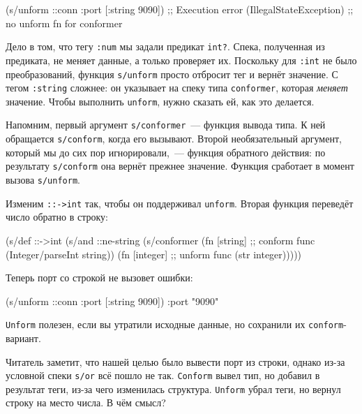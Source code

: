 \else

\begin{english}
  \begin{clojure}
(s/unform ::conn {:port [:string 9090]})
;; Execution error (IllegalStateException)
;; no unform fn for conformer
  \end{clojure}
\end{english}

\fi

Дело в том, что тегу \verb|:num| мы задали предикат \verb|int?|. Спека,
полученная из предиката, не меняет данные, а только проверяет их. Поскольку для
\verb|:int| не было преобразований, функция \verb|s/unform| просто отбросит тег
и вернёт значение. С тегом \verb|:string| сложнее: он указывает на спеку типа
\verb|conformer|, которая \emph{меняет} значение. Чтобы выполнить \verb|unform|,
нужно сказать ей, как это делается.


Напомним, первый аргумент \verb|s/conformer|~--- функция вывода типа. К ней
обращается \verb|s/conform|, когда его вызывают. Второй необязательный аргумент,
который мы до сих пор игнорировали,~--- функция обратного действия: по
результату \verb|s/conform| она вернёт прежнее значение. Функция сработает в
момент вызова \verb|s/unform|.

Изменим \verb|::->int| так, чтобы он поддерживал \verb|unform|. Вторая функция
переведёт число обратно в строку:

\begin{english}
  \begin{clojure}
(s/def ::->int
  (s/and
   ::ne-string
   (s/conformer
    (fn [string] ;; conform func
      (Integer/parseInt string))
    (fn [integer] ;; unform func
      (str integer)))))
  \end{clojure}
\end{english}

\noindent
Теперь порт со строкой не вызовет ошибки:

\begin{english}
  \begin{clojure}
(s/unform ::conn {:port [:string 9090]})
{:port "9090"}
  \end{clojure}
\end{english}

\verb|Unform| полезен, если вы утратили исходные данные, но сохранили их
\verb|conform|-вариант.

Читатель заметит, что нашей целью было вывести порт из строки, однако из-за
условной спеки \verb|s/or| всё пошло не так. \verb|Conform| вывел тип, но
добавил в результат теги, из-за чего изменилась структура. \verb|Unform| убрал
теги, но вернул строку на место числа. В чём смысл?

